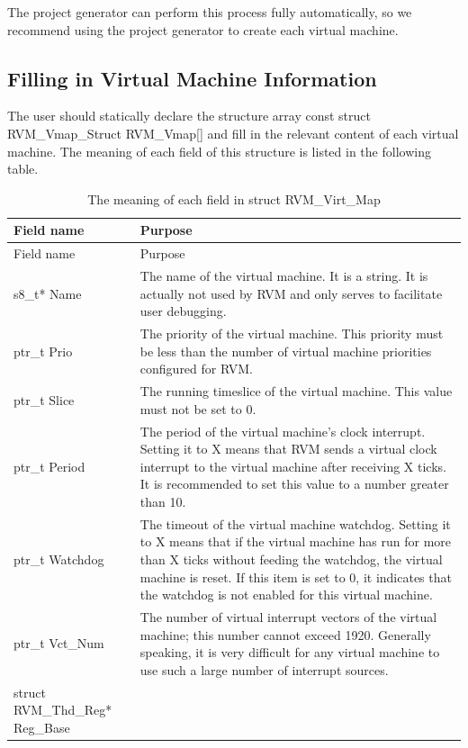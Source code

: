 The project generator can perform this process fully automatically, so we recommend using the project generator to create each virtual machine.

\subsection{Filling in Virtual Machine Information}\label{subsec:4-2-1}

The user should statically declare the structure array const struct RVM\_Vmap\_Struct RVM\_Vmap{[}{]} and fill in the relevant content of each virtual machine. The meaning of each field of this structure is listed in the following table.

\begin{xltabular}{\textwidth}{@{}>{\hsize\raggedright\arraybackslash}X>{\hsize\raggedright\arraybackslash}X@{}}
\caption{The meaning of each field in struct RVM\_\allowbreak{}Virt\_\allowbreak{}Map}\label{tab:4-1}\\
\toprule
Field name & Purpose\tabularnewline
\endfirsthead
\toprule
Field name & Purpose\tabularnewline
\midrule
\endhead
\bottomrule
\endlastfoot
s8\_\allowbreak{}t* Name &
The name of the virtual machine. It is a string. It is actually not used by RVM and only serves to facilitate user debugging.\tabularnewline
ptr\_\allowbreak{}t Prio &
The priority of the virtual machine. This priority must be less than the number of virtual machine priorities configured for RVM.\tabularnewline
ptr\_\allowbreak{}t Slice & The running timeslice of the virtual machine. This value must not be set to 0.\tabularnewline
ptr\_\allowbreak{}t Period &
The period of the virtual machine's clock interrupt. Setting it to X means that RVM sends a virtual clock interrupt to the virtual machine after receiving X ticks. It is recommended to set this value to a number greater than 10.\tabularnewline
ptr\_\allowbreak{}t Watchdog &
The timeout of the virtual machine watchdog. Setting it to X means that if the virtual machine has run for more than X ticks without feeding the watchdog, the virtual machine is reset. If this item is set to 0, it indicates that the watchdog is not enabled for this virtual machine.\tabularnewline
ptr\_\allowbreak{}t Vct\_\allowbreak{}Num &
The number of virtual interrupt vectors of the virtual machine; this number cannot exceed 1920. Generally speaking, it is very difficult for any virtual machine to use such a large number of interrupt sources.\tabularnewline
struct RVM\_\allowbreak{}Thd\_\allowbreak{}Reg* Reg\_\allowbreak{}Base &

\end{xltabular}
